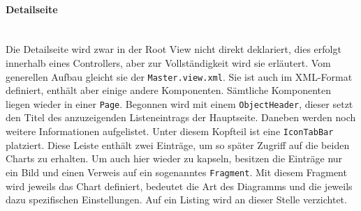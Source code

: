\paragraph{Detailseite}$\;$ \\
Die Detailseite wird zwar in der Root View nicht direkt deklariert, dies erfolgt innerhalb eines Controllers, aber zur Vollständigkeit wird sie erläutert. Vom generellen Aufbau gleicht sie der \texttt{Master.view.xml}. Sie ist auch im XML-Format definiert, enthält aber einige andere Komponenten. Sämtliche Komponenten liegen wieder in einer \texttt{Page}. Begonnen wird mit einem \texttt{ObjectHeader}, dieser setzt den Titel des anzuzeigenden Listeneintrags der Hauptseite. Daneben werden noch weitere Informationen aufgelistet. Unter diesem Kopfteil ist eine \texttt{IconTabBar} platziert. Diese Leiste enthält zwei Einträge, um so später Zugriff auf die beiden Charts zu erhalten. Um auch hier wieder zu kapseln, besitzen die Einträge nur ein Bild und einen Verweis auf ein sogenanntes \texttt{Fragment}. Mit diesem Fragment wird jeweils das Chart definiert, bedeutet die Art des Diagramms und die jeweils dazu spezifischen Einstellungen. Auf ein Listing wird an dieser Stelle verzichtet.

